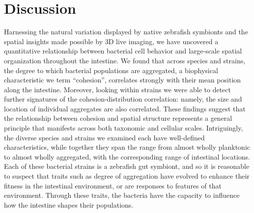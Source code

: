 



\section*{Discussion}	

Harnessing the natural variation displayed by native zebrafish symbionts and the spatial insights made possible by 3D live imaging, we have uncovered a quantitative relationship between bacterial cell behavior and large-scale spatial organization throughout the intestine. We found that across species and strains, the degree to which bacterial populations are aggregated, a biophysical characteristic we term ``cohesion'', correlates strongly with their mean position along the intestine. Moreover, looking within strains we were able to detect further signatures of the cohesion-distribution correlation: namely, the size and location of individual aggregates are also correlated. These findings suggest that the relationship between cohesion and spatial structure represents a general principle that manifests across both taxonomic and cellular scales. Intriguingly, the diverse species and strains we examined each have well-defined characteristics, while together they span the range from almost wholly planktonic to almost wholly aggregated, with the corresponding range of intestinal locations. Each of these bacterial strains is a zebrafish gut symbiont, and so it is reasonable to suspect that traits such as degree of aggregation have evolved to enhance their fitness in the intestinal environment, or are responses to features of that environment. Through these traits, the bacteria have the capacity to influence how the intestine shapes their populations.

